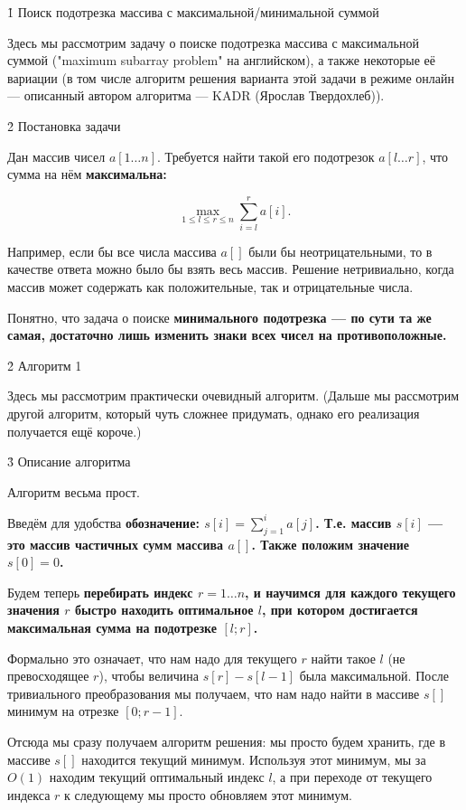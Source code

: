 \h1{ Поиск подотрезка массива с максимальной/минимальной суммой }

Здесь мы рассмотрим задачу о поиске подотрезка массива с максимальной суммой ("maximum subarray problem" на английском), а также некоторые её вариации (в том числе алгоритм решения варианта этой задачи в режиме онлайн --- описанный автором алгоритма --- KADR (Ярослав Твердохлеб)).


\h2{ Постановка задачи }

Дан массив чисел $a[1 \ldots n]$. Требуется найти такой его подотрезок $a[l \ldots r]$, что сумма на нём \bf{максимальна}:

$$ \max_{ 1 \le l \le r \le n } \sum_{i=l}^{r} a[i]. $$

Например, если бы все числа массива $a[]$ были бы неотрицательными, то в качестве ответа можно было бы взять весь массив. Решение нетривиально, когда массив может содержать как положительные, так и отрицательные числа.

Понятно, что задача о поиске \bf{минимального} подотрезка --- по сути та же самая, достаточно лишь изменить знаки всех чисел на противоположные.


\h2{ Алгоритм 1 }

Здесь мы рассмотрим практически очевидный алгоритм. (Дальше мы рассмотрим другой алгоритм, который чуть сложнее придумать, однако его реализация получается ещё короче.)

\h3{ Описание алгоритма }

Алгоритм весьма прост.

Введём для удобства \bf{обозначение}: $s[i] = \sum_{j=1}^{i} a[j]$. Т.е. массив $s[i]$ --- это массив частичных сумм массива $a[]$. Также положим значение $s[0] = 0$.

Будем теперь \bf{перебирать} индекс $r = 1 \ldots n$, и научимся для каждого текущего значения $r$ быстро находить оптимальное $l$, при котором достигается максимальная сумма на подотрезке $[l; r]$.

Формально это означает, что нам надо для текущего $r$ найти такое $l$ (не превосходящее $r$), чтобы величина $s[r] - s[l-1]$ была максимальной. После тривиального преобразования мы получаем, что нам надо найти в массиве $s[]$ минимум на отрезке $[0;r-1]$.

Отсюда мы сразу получаем алгоритм решения: мы просто будем хранить, где в массиве $s[]$ находится текущий минимум. Используя этот минимум, мы за $O(1)$ находим текущий оптимальный индекс $l$, а при переходе от текущего индекса $r$ к следующему мы просто обновляем этот минимум.

